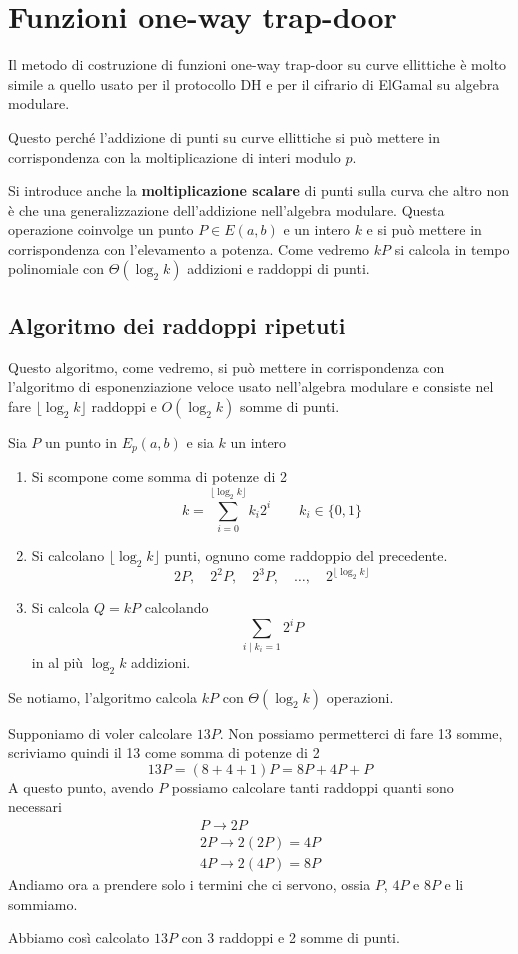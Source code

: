 \section{Funzioni one-way trap-door}
Il metodo di costruzione di funzioni one-way trap-door su curve ellittiche \`e molto simile a quello usato per
il protocollo DH e per il cifrario di ElGamal su algebra modulare.

Questo perch\'e l'addizione di punti su curve ellittiche si pu\`o mettere in corrispondenza con la moltiplicazione
di interi modulo $p$.

Si introduce anche la \textbf{moltiplicazione scalare} di punti sulla curva che altro non \`e che una
generalizzazione dell'addizione nell'algebra modulare. Questa operazione coinvolge un punto $P \in E(a, b)$ e un
intero $k$ e si pu\`o mettere in corrispondenza con l'elevamento a potenza. Come vedremo $k P$ si calcola
in tempo polinomiale con $\Theta(\log_2 k)$ addizioni e raddoppi di punti.

\subsection{Algoritmo dei raddoppi ripetuti}
Questo algoritmo, come vedremo, si pu\`o mettere in corrispondenza con l'algoritmo di esponenziazione veloce usato
nell'algebra modulare e consiste nel fare $\lfloor \log_2 k \rfloor$ raddoppi e $O(\log_2 k)$ somme di punti.

Sia $P$ un punto in $E_p(a, b)$ e sia $k$ un intero
\begin{enumerate}
	\item Si scompone come somma di potenze di 2
	      \[ k = \sum_{i=0}^{\lfloor \log_2 k \rfloor} k_i 2^i \quad \quad k_i \in \{ 0, 1 \} \]
	\item Si calcolano $\lfloor \log_2 k \rfloor$ punti, ognuno come raddoppio del precedente.
	      \[ 2P, \quad 2^2P, \quad 2^3 P, \quad \dots, \quad 2^{\lfloor\log_2 k \rfloor} \]
	\item Si calcola $Q = kP$ calcolando
	      \[ \sum_{i \mid k_i = 1} 2^i P \]
	      in al pi\`u $\log_2 k$ addizioni.
\end{enumerate}
Se notiamo, l'algoritmo calcola $kP$ con $\Theta(\log_2 k)$ operazioni.

\begin{example}
	Supponiamo di voler calcolare $13P$. Non possiamo permetterci di fare 13 somme, scriviamo quindi il 13 come
	somma di potenze di 2
	\[ 13P = (8 + 4 + 1) P = 8P + 4P + P \]
	A questo punto, avendo $P$ possiamo calcolare tanti raddoppi quanti sono necessari
	\[
		\begin{matrix}
			P \rightarrow 2P          \\
			2P \rightarrow 2(2P) = 4P \\
			4P \rightarrow 2(4P) = 8P
		\end{matrix}
	\]
	Andiamo ora a prendere solo i termini che ci servono, ossia $P$, $4P$ e $8P$ e li sommiamo.

	Abbiamo cos\`i calcolato $13P$ con 3 raddoppi e 2 somme di punti.
\end{example}

